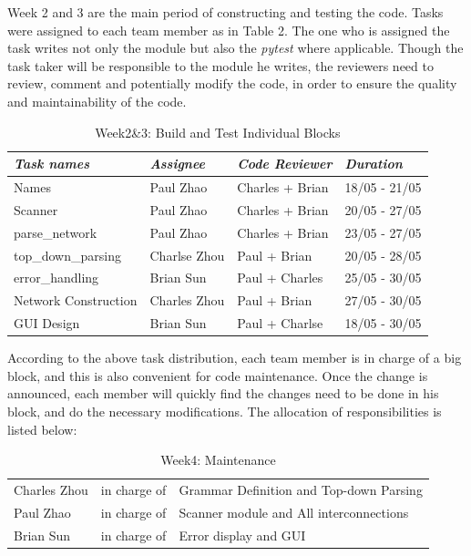 \documentclass[12pt]{article}
\def\n{\noindent}
\begin{document}
\n Week 2 and 3 are the main period of constructing and testing the code. Tasks were assigned to each team member as in Table 2. The one who is assigned the task writes not only the module but also the \textit{pytest} where applicable. Though the task taker will be responsible to the module he writes, the reviewers need to review, comment and potentially modify the code, in order to ensure the quality and maintainability of the code. 

\begin{table}[H]
\begin{tabular}{p{4.5cm}p{3.5cm}p{4cm}p{2.5cm}} 
\textit{Task names} & \textit{Assignee} & \textit{Code Reviewer} & \textit{Duration}\\
\hline
Names & Paul Zhao & Charles + Brian & 18/05 - 21/05\\
Scanner & Paul Zhao & Charles + Brian & 20/05 - 27/05\\
parse\_network & Paul Zhao & Charles + Brian & 23/05 - 27/05\\
top\_down\_parsing & Charlse Zhou & Paul + Brian & 20/05 - 28/05\\
error\_handling & Brian Sun & Paul + Charles & 25/05 - 30/05\\
Network Construction & Charles Zhou & Paul + Brian & 27/05 - 30/05\\
GUI Design & Brian Sun & Paul + Charlse & 18/05 - 30/05\\
\end{tabular}
\caption{Week2\&3: Build and Test Individual Blocks}
\end{table}

\n According to the above task distribution, each team member is in charge of a big block, and this is also convenient for code maintenance. Once the change is announced, each member will quickly find the changes need to be done in his block, and do the necessary modifications. The allocation of responsibilities is listed below: 
\begin{table}[H]
\begin{tabular}{p{3cm}p{4cm}p{8cm}} 
Charles Zhou & in charge of & Grammar Definition and Top-down Parsing\\
Paul Zhao & in charge of & Scanner module and All interconnections\\
Brian Sun & in charge of & Error display and GUI\\
\end{tabular}
\caption{Week4: Maintenance}
\end{table}
\end{document}
